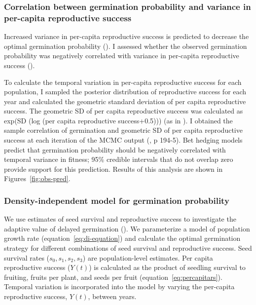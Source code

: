 \documentclass[12pt, oneside]{article}   	%
\begin{document}

\subsubsection{Correlation between germination probability and variance in per-capita reproductive success}

Increased variance in per-capita reproductive success is predicted to decrease the optimal germination probability (\cite{cohen1966,ellner1985a}). I assessed whether the observed germination probability was negatively correlated with variance in per-capita reproductive success (\cite{venable2007}).

To calculate the temporal variation in per-capita reproductive success for each population, I sampled the posterior distribution of reproductive success for each year and calculated the geometric standard deviation of per capita reproductive success. The geometric SD of per capita reproductive success was calculated as exp(SD (log (per capita reproductive success+0.5))) (as in \cite{venable2007}). I obtained the sample correlation of germination and geometric SD of per capita reproductive success at each iteration of the MCMC output (\cite{hobbs2015b}, p 194-5). Bet hedging models predict that germination probability should be negatively correlated with temporal variance in fitness; 95\% credible intervals that do not overlap zero provide support for this prediction. Results of this analysis are shown in Figures~\ref{fig:obs-pred}.


\subsubsection{Density-independent model for germination probability}

We use estimates of seed survival and reproductive success to investigate the adaptive value of delayed germination (\cite{gremer2014}). We parameterize a model of population growth rate (equation~\ref{eq:di-equation}) and calculate the optimal germination strategy for different combinations of seed survival and reproductive success. Seed survival rates ($s_0, s_1, s_2, s_3$) are population-level estimates. Per capita reproductive success ($Y(t)$) is calculated as the product of seedling survival to fruiting, fruits per plant, and seeds per fruit (equation~\eqref{eq:percapitars}). Temporal variation is incorporated into the model by varying the per-capita reproductive success, $Y(t)$, between years.
\end{document}
